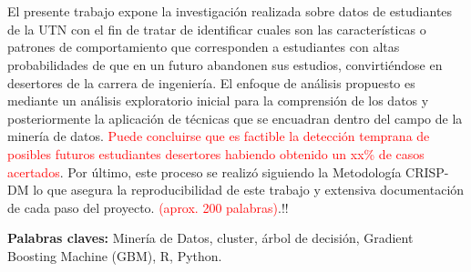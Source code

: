 \chapter*{\runtitulo}

\noindent El presente trabajo expone la investigación realizada sobre datos de estudiantes de la UTN  con el fin de tratar de identificar cuales son las características o patrones de comportamiento que corresponden a estudiantes con altas probabilidades de que en un futuro abandonen sus estudios, convirtiéndose en desertores de la carrera de ingeniería. El enfoque de análisis propuesto es mediante un análisis exploratorio inicial para la comprensión de los datos y posteriormente la aplicación de técnicas que se encuadran dentro del campo de la minería de datos. \textcolor{red}{Puede concluirse que es factible la detección temprana de posibles futuros estudiantes desertores habiendo obtenido un xx\% de casos acertados}. Por último, este proceso se realizó siguiendo la Metodología CRISP-DM lo que asegura la reproducibilidad de este trabajo y extensiva documentación de cada paso del proyecto.
\textcolor{red}{(aprox. 200 palabras)}.!!

\bigskip

\noindent\textbf{Palabras claves:} Minería de Datos, cluster, árbol de decisión, Gradient Boosting Machine (GBM), R, Python.



